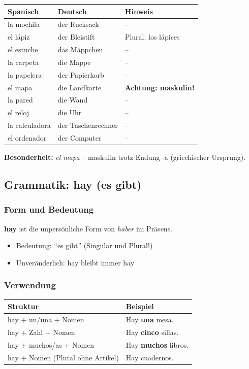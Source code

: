 \documentclass[11pt,a4paper]{article}
\begin{document}
\begin{center}
\begin{tabular}{|l|l|l|}
\hline
\textbf{Spanisch} & \textbf{Deutsch} & \textbf{Hinweis} \\
\hline
la mochila & der Rucksack & -- \\
el lápiz & der Bleistift & Plural: los lápices \\
el estuche & das Mäppchen & -- \\
la carpeta & die Mappe & -- \\
la papelera & der Papierkorb & -- \\
el mapa & die Landkarte & \textbf{Achtung: maskulin!} \\
la pared & die Wand & -- \\
el reloj & die Uhr & -- \\
la calculadora & der Taschenrechner & -- \\
el ordenador & der Computer & -- \\
\hline
\end{tabular}
\end{center}

\textbf{Besonderheit:} \textit{el mapa} -- maskulin trotz Endung -a (griechischer Ursprung).

\subsection{Grammatik: hay (es gibt)}

\subsubsection{Form und Bedeutung}

\textbf{hay} ist die unpersönliche Form von \textit{haber} im Präsens.
\begin{itemize}
    \item Bedeutung: ``es gibt'' (Singular und Plural!)
    \item Unveränderlich: hay bleibt immer hay
\end{itemize}

\subsubsection{Verwendung}

\begin{center}
\begin{tabular}{|l|l|}
\hline
\textbf{Struktur} & \textbf{Beispiel} \\
\hline
hay + un/una + Nomen & Hay \textbf{una} mesa. \\
hay + Zahl + Nomen & Hay \textbf{cinco} sillas. \\
hay + muchos/as + Nomen & Hay \textbf{muchos} libros. \\
hay + Nomen (Plural ohne Artikel) & Hay cuadernos. \\
\hline
\end{tabular}
\end{center}
\end{document}
